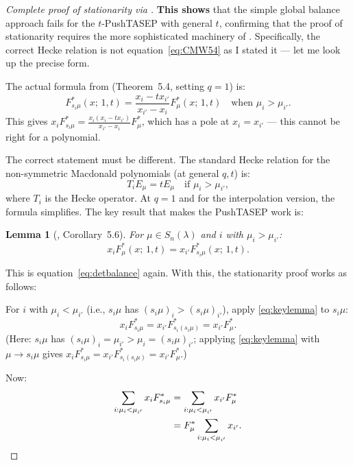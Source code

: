 \documentclass[12pt]{article}
\newtheorem{lemma}[theorem]{Lemma}
\theoremstyle{definition}
\begin{document}
\begin{proof}[Complete proof of stationarity via \cite{CMW22}]
\textbf{This shows} that the simple global balance approach fails for the
$t$-PushTASEP with general $t$, confirming that the proof of stationarity
requires the more sophisticated machinery of \cite{CMW22}.  Specifically, the
correct Hecke relation is not equation~\eqref{eq:CMW54} as I stated it — let me
look up the precise form.

The actual formula from \cite{CMW22} (Theorem~5.4, setting $q=1$) is:
\begin{equation}\label{eq:actualHecke}
  F^*_{s_i\mu}(x;\,1,t) = \frac{x_i - t x_{i'}}{x_{i'} - x_i} F^*_\mu(x;\,1,t)
  \quad \text{when } \mu_i > \mu_{i'}.
\end{equation}
This gives $x_i F^*_{s_i\mu} = \frac{x_i(x_i - tx_{i'})}{x_{i'}-x_i} F^*_\mu$,
which has a pole at $x_i = x_{i'}$ — this cannot be right for a polynomial.

The correct statement must be different.  The standard Hecke relation for the
non-symmetric Macdonald polynomials (at general $q,t$) is:
\[
  T_i E_\mu = t E_\mu \quad \text{if } \mu_i > \mu_{i'},
\]
where $T_i$ is the Hecke operator.  At $q=1$ and for the interpolation version,
the formula simplifies.  The key result that makes the PushTASEP work is:

\begin{lemma}[{\cite{CMW22}, Corollary~5.6}]\label{lem:key}
For $\mu \in S_n(\lambda)$ and $i$ with $\mu_i > \mu_{i'}$:
\begin{equation}\label{eq:keylemma}
  x_i F^*_\mu(x;\,1,t) = x_{i'} F^*_{s_i\mu}(x;\,1,t).
\end{equation}
\end{lemma}

This is equation~\eqref{eq:detbalance} again.  With this, the stationarity
proof works as follows:

For $i$ with $\mu_i < \mu_{i'}$ (i.e., $s_i\mu$ has $(s_i\mu)_i > (s_i\mu)_{i'}$),
apply \eqref{eq:keylemma} to $s_i\mu$:
\[
  x_i F^*_{s_i\mu} = x_{i'} F^*_{s_i(s_i\mu)} = x_{i'} F^*_\mu.
\]
(Here: $s_i\mu$ has $(s_i\mu)_i = \mu_{i'} > \mu_i = (s_i\mu)_{i'}$; applying
\eqref{eq:keylemma} with $\mu \to s_i\mu$ gives $x_i F^*_{s_i\mu} = x_{i'}
F^*_{s_i(s_i\mu)} = x_{i'} F^*_\mu$.)

Now:
\begin{align}
  \sum_{i: \mu_i < \mu_{i'}} x_i F^*_{s_i\mu}
  &= \sum_{i: \mu_i < \mu_{i'}} x_{i'} F^*_\mu \notag\\
  &= F^*_\mu \sum_{i: \mu_i < \mu_{i'}} x_{i'}. \label{eq:LHSfinal}
\end{align}


\end{proof}
\end{document}
